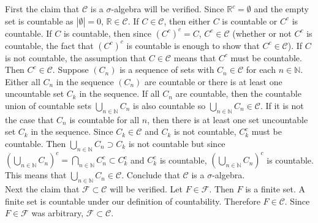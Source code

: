 \documentclass[a4paper]{article}
\begin{document}
First the claim that $\mathcal{C}$ is a $\sigma$-algebra will be verified. Since $\mathbb{R}^c = \emptyset$ and the empty set is countable as $|\emptyset| = 0$, $\mathbb{R} \in \mathcal{C}$. If $C \in \mathcal{C}$, then either $C$ is countable or $C^c$ is countable. If $C$ is countable, then since $(C^c)^c = C$, $C^c \in \mathcal{C}$ (whether or not $C^c$ is countable, the fact that $(C^c)^c$ is countable is enough to show that $C^c \in \mathcal{C}$). If $C$ is not countable, the assumption that $C\in \mathcal{C}$ means that $C^c$ must be countable. Then $C^c \in \mathcal{C}$. Suppose $(C_n)$ is a sequence of sets with $C_n \in \mathcal{C}$ for each $n \in \mathbb{N}$. Either all $C_n$ in the sequence $(C_n)$ are countable or there is at least one uncountable set $C_k$ in the sequence. If all $C_n$ are countable, then the countable union of countable sets $\bigcup_{n \in \mathbb{N}} C_n$ is also countable so $\bigcup_{n \in \mathbb{N}} C_n \in \mathcal{C}$. If it is not the case that $C_n$ is countable for all $n$, then there is at least one set uncountable set $C_{k}$ in the sequence. Since $C_k \in \mathcal{C}$ and $C_k$ is not countable, $C_k^c$ must be countable. Then $\bigcup_{n\in \mathbb{N}} C_n \supset C_k$ is not countable but since $\left(\bigcup_{n \in \mathbb{N}} C_n\right)^c = \bigcap_{n\in \mathbb{N}} C_n^c \subset C_k^c$ and $C_k^c$ is countable, $\left(\bigcup_{n \in \mathbb{N}} C_n\right)^c$ is countable. This means that $\bigcup_{n \in \mathbb{N}} C_n \in \mathcal{C}$. Conclude that $\mathcal{C}$ is a $\sigma$-algebra. \\

Next the claim that $\mathcal{F} \subset \mathcal{C}$ will be verified. Let $F \in \mathcal{F}$. Then $F$ is a finite set. A finite set is countable under our definition of countability. Therefore $F \in \mathcal{C}$. Since $F \in \mathcal{F}$ was arbitrary, $\mathcal{F}\subset \mathcal{C}$.  \\
\end{document}
